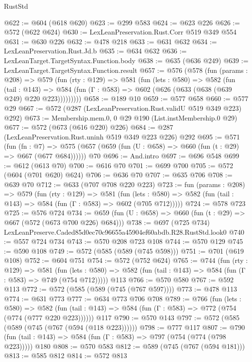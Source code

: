 \begin{lexlean}{RustStd}
\begin{coremodule}
@622 := @604 (@618 @620)
@623 := @299 @583
@624 := @623 @226
@626 := @572 (@622 @624)
@630 := LexLeanPreservation.Rust.Corr @519 @349 @554
@631 := @630 @226
@632 := @478 @218
@633 := @631 @632
@634 := LexLeanPreservation.Rust.Jd.b
@635 := @634 @632
@636 := LexLeanTarget.TargetSyntax.Function.body
@638 := @635 (@636 @249)
@639 := LexLeanTarget.TargetSyntax.Function.result
@657 := @576
    (@578
      (fun (params : @208) =>
      @579
        (fun (rty : @129) =>
        @581
          (fun (lets : @580) =>
          @582
            (fun (tail : @143) =>
            @584 (fun (Γ : @583) => @602 (@626 (@633 (@638 (@639 @249) @220 @223)))))))))
@658 := @189 @10
@659 := @577 @658
@660 := @577 @29
@667 := @572 (@287 (LexLeanPreservation.Rust.validU @519 @349 @223) @292)
@673 := Membership.mem.{0, 0} @29 @190 (List.instMembership.{0} @29)
@677 := @572 (@673 (@616 @220) @226)
@684 := @287 (LexLeanPreservation.Rust.uninh @519 @349 @223 @226) @292
@695 := @571
    (fun (fn : @7) =>
    @575 (@657 (@659 (fun (U : @658) => @660 (fun (t : @29) => @667 (@677 @684))))))
    @70
@696 := And.intro
@697 := @696 @548
@699 := @612 (@613 @70)
@700 := @616 @70
@701 := @699 @700
@705 := @572 (@604 (@701 @620) @624)
@706 := @636 @70
@707 := @635 @706
@708 := @639 @70
@712 := @633 (@707 @708 @220 @223)
@723 := fun (params : @208) =>
  @579
    (fun (rty : @129) =>
    @581
      (fun (lets : @580) => @582 (fun (tail : @143) => @584 (fun (Γ : @583) => @602 (@705 @712)))))
@724 := @578 @723
@725 := @576 @724
@734 := @659 (fun (U : @658) => @660 (fun (t : @29) => @667 (@572 (@673 @700 @226) @684)))
@738 := @697 (@725 @734) LexLeanPreserve.Caded85d0ec70c96655a45904ef60abdb.R28.RustStd.look0
@740 := @557 @724 @734
@743 := @570 @208 @723 @108
@744 := @570 @129
@745 := @590 @108
@749 := @572 (@585 (@589 (@745 @598)))
@751 := @701 (@619 @108)
@752 := @604 @751
@754 := @572 (@752 @624)
@765 := @744
    (fun (rty : @129) =>
    @581
      (fun (lets : @580) => @582 (fun (tail : @143) => @584 (fun (Γ : @583) => @749 (@754 @712)))))
    @113
@766 := @570 @580
@767 := @592 @113
@772 := @572 (@585 (@589 (@745 (@767 @597))))
@773 := @478 @113
@774 := @631 @773
@777 := @634 @773 @706 @708
@789 := @766
    (fun (lets : @580) =>
    @582 (fun (tail : @143) => @584 (fun (Γ : @583) => @772 (@754 (@774 (@777 @220 @223))))))
    @117
@790 := @570 @143
@797 := @572 (@585 (@589 (@745 (@767 (@594 (@118 @223))))))
@798 := @777 @117
@807 := @790 (fun (tail : @143) => @584 (fun (Γ : @583) => @797 (@754 (@774 (@798 @223))))) @180
@808 := @570 @583
@812 := @589 (@745 (@767 (@594 @181)))
@813 := @585 @812
@814 := @572 @813

\end{coremodule}
\end{lexlean}
